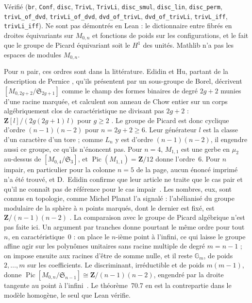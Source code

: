\begin{sloppypar}
\noindent Vérifié (\texttt{br}, \texttt{Conf}, \texttt{disc}, \texttt{TrivL}, \texttt{TrivLi}, \texttt{disc\_smul}, \texttt{disc\_lin}, \texttt{disc\_perm}, \texttt{trivL\_of\_dvd}, \texttt{trivLi\_of\_dvd}, \texttt{dvd\_of\_trivL}, \texttt{dvd\_of\_trivLi}, \texttt{trivL\_iff}, \texttt{trivLi\_iff}). Ne sont pas démontrés en Lean : le dictionnaire entre fibrés en droites équivariants sur $M_{0,n}$ et fonctions de poids sur les configurations, et le fait que le groupe de Picard équivariant soit le $H^1$ des unités. Mathlib n'a pas les espaces de modules $M_{0,n}$.
\end{sloppypar}

Pour $n$ pair, ces ordres sont dans la littérature. Edidin et Hu, partant de la description de Pernice \cite{pernice2022}, qu'ils présentent par un sous-groupe de Borel, décrivent $[M_{0,2g+2}/\mathfrak S_{2g+1}]$ comme le champ des formes binaires de degré $2g+2$ munies d'une racine marquée, et calculent son anneau de Chow entier sur un corps algébriquement clos de caractéristique ne divisant pas $2g+2$ : $\mathbf Z[l]/(2g(2g+1)\,l)$ pour $g \geqslant 2$ \cite[théorème~1.3]{edidinhu2025}. Le groupe de Picard est donc cyclique d'ordre $(n-1)(n-2)$ pour $n = 2g+2 \geqslant 6$. Leur générateur $l$ est la classe d'un caractère d'un tore ; comme $L_n$ y est d'ordre $(n-1)(n-2)$, il engendre aussi ce groupe, ce qu'ils n'énoncent pas. Pour $n = 4$, $M_{1,1}$ est une gerbe en $\mu_2$ au-dessus de $[M_{0,4}/\mathfrak S_3]$, et $\operatorname{Pic}(M_{1,1}) = \mathbf Z/12$ \cite{mumford1965,fultonolsson2010} donne l'ordre~$6$. Pour $n$ impair, en particulier pour la colonne $n = 5$ de la page, aucun énoncé imprimé n'a été trouvé, et D.~Edidin confirme que leur article ne traite que le cas pair et qu'il ne connaît pas de référence pour le cas impair~\cite{edidin2026}. Les nombres, eux, sont connus en topologie, comme Michel Planat l'a signalé : l'abélianisé du groupe modulaire de la sphère à $n$ points marqués, dont le dernier est fixé, est $\mathbf Z/(n-1)(n-2)$ \cite[lemme~2.2]{bigelowbudney2001}. La comparaison avec le groupe de Picard algébrique n'est pas faite ici. Un argument par tranches donne pourtant le même ordre pour tout $n$, en caractéristique~$0$ : on place le $n$-ième point à l'infini, ce qui laisse le groupe affine agir sur les polynômes unitaires sans racine multiple de degré $m = n-1$ ; on impose ensuite aux racines d'être de somme nulle, et il reste $\mathbb G_m$, de poids $2, \ldots, m$ sur les coefficients. Le discriminant, irréductible et de poids $m(m-1)$, donne $\operatorname{Pic}[M_{0,n}/\mathfrak S_{n-1}] \cong \mathbf Z/(n-1)(n-2)$, engendré par la droite tangente au point à l'infini~\cite{mo516243}. Le théorème~70.7 en est la contrepartie dans le modèle homogène, le seul que Lean vérifie.


